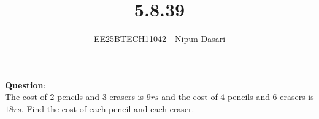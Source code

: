 \documentclass[journal]{IEEEtran}
\begin{document}
	
	
	\vspace{3cm}
	
	\title{5.8.39}
	\author{EE25BTECH11042 - Nipun Dasari}
	\maketitle
	
	\renewcommand{\thefigure}{\theenumi}
	\renewcommand{\thetable}{\theenumi}
	\setlength{\intextsep}{10pt} %
	
	
	\renewcommand{\thetable}{\theenumi}
	
	\textbf{Question}:\\
	The cost of $2$ pencils and $3$	 erasers is $9rs$ and the cost of $4$ pencils and $6$ erasers is
	$18rs$. Find the cost of each pencil and each eraser.
	
\end{document}
